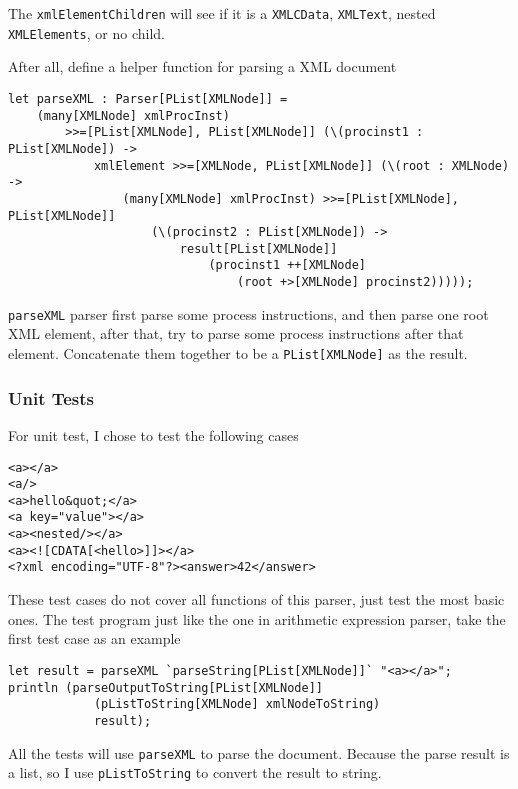 The \texttt{xmlElementChildren} will see if it is a \texttt{XMLCData}, \texttt{XMLText}, nested \texttt{XMLElements}, or no child.

After all, define a helper function for parsing a XML document

\begin{lstlisting}
let parseXML : Parser[PList[XMLNode]] =
    (many[XMLNode] xmlProcInst)
        >>=[PList[XMLNode], PList[XMLNode]] (\(procinst1 : PList[XMLNode]) ->
            xmlElement >>=[XMLNode, PList[XMLNode]] (\(root : XMLNode) ->
                (many[XMLNode] xmlProcInst) >>=[PList[XMLNode], PList[XMLNode]]
                    (\(procinst2 : PList[XMLNode]) ->
                        result[PList[XMLNode]]
                            (procinst1 ++[XMLNode]
                                (root +>[XMLNode] procinst2)))));
\end{lstlisting}

\texttt{parseXML} parser first parse some process instructions, and then parse one root XML element, after that, try to parse some process instructions after that element. Concatenate them together to be a \texttt{PList[XMLNode]} as the result.

\subsubsection{Unit Tests}

For unit test, I chose to test the following cases

\begin{lstlisting}[language={}]
<a></a>
<a/>
<a>hello&quot;</a>
<a key="value"></a>
<a><nested/></a>
<a><![CDATA[<hello>]]></a>
<?xml encoding="UTF-8"?><answer>42</answer>
\end{lstlisting}

These test cases do not cover all functions of this parser, just test the most basic ones. The test program just like the one in arithmetic expression parser, take the first test case as an example

\begin{lstlisting}
let result = parseXML `parseString[PList[XMLNode]]` "<a></a>";
println (parseOutputToString[PList[XMLNode]]
            (pListToString[XMLNode] xmlNodeToString)
            result);
\end{lstlisting}

All the tests will use \texttt{parseXML} to parse the document. Because the parse result is a list, so I use \texttt{pListToString} to convert the result to string.

